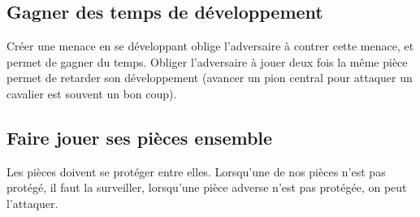 \subsection{Gagner des temps de développement}
Créer une menace en se développant oblige l'adversaire à contrer cette menace, et permet de gagner du temps.
Obliger l'adversaire à jouer deux fois la même pièce permet de retarder son développement
(avancer un pion central pour attaquer un cavalier est souvent un bon coup).


\subsection{Faire jouer ses pièces ensemble}

Les pièces doivent se protéger entre elles. Lorsqu'une de nos pièces n'est pas protégé, il faut la surveiller, lorsqu'une pièce adverse n'est pas protégée, on peut l'attaquer.





